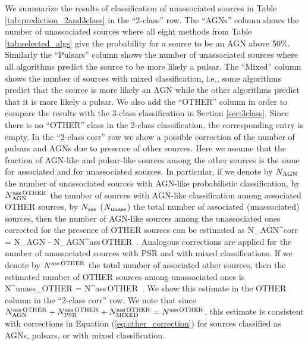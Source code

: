 We summarize the results of classification of unassociated sources in Table \ref{tab:prediction_2and3class} in the ``2-class'' row.
The ``AGNs'' column shows the number of unassociated sources where all eight methods from Table \ref{tab:selected_algs} 
give the probability for a source to be an AGN above 50\%.
Similarly the ``Pulsars'' column shows the number of unassociated sources where all algorithms predict the source to be more likely a pulsar.
The ``Mixed'' column shows the number of sources with mixed classification, i.e., some algorithms predict that the source is more likely an AGN while the other algorithms predict that it is more likely a pulsar.
We also add the ``OTHER'' column in order to compare the results with the 3-class classification in Section \ref{sec:3class}.
Since there is no ``OTHER'' class in the 2-class classification, the corresponding entry is empty.
In the ``2-class corr'' row we show a possible correction of the number of pulsars and AGNs due to presence of other sources.
Here we assume that the fraction of AGN-like and pulsar-like sources among the other sources is the same for associated and for unassociated sources.
In particular, if we denote by $N_{\rm AGN}$ the number of unassociated sources with AGN-like probabilistic classification,
by $N_{\rm AGN}^{\rm ass\,OTHER}$ the number of sources with AGN-like classification among associated OTHER sources,
by $N_{\rm ass}$ ($N_{\rm unass}$) the total number of associated (unassociated) sources, then
the number of AGN-like sources among the unassociated ones corrected for the presence of OTHER sources can be estimated as
\be
{}
N_{\rm AGN}^{\rm corr} = N_{\rm AGN} - N_{\rm AGN}^{\rm ass\,OTHER} \,.
\ee
Analogous corrections are applied for the number of unassociated sources with PSR and with mixed classifications.
If we denote by $N^{\rm ass\,OTHER}$ the total number of associated other sources, then the estimated number of 
OTHER sources among unassociated ones is
\be
{}
N^{\rm unass}_{\rm OTHER} = N^{\rm ass\,OTHER} \,.
\ee
We show this estimate in the OTHER column in the ``2-class corr'' row.
We note that since 
$N_{\rm AGN}^{\rm ass\,OTHER} + N_{\rm PSR}^{\rm ass\,OTHER} + N_{\rm MIXED}^{\rm ass\,OTHER} = N^{\rm ass\,OTHER}$,
this estimate is consistent with corrections in Equation (\ref{eq:other_correction}) for sources classified as AGNs, pulsars, or with mixed classification.


